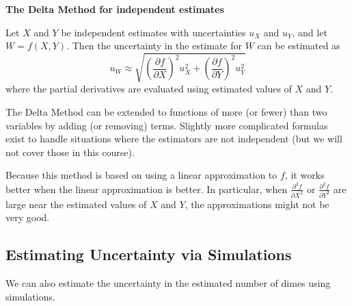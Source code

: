 \documentclass[twoside]{book}\usepackage[]{graphicx}\usepackage[]{xcolor}
\newlength{\tempfmlength}
\newenvironment{fmpage}[1]
     {
	 \medskip
	 \setlength{\tempfmlength}{#1}
	 \begin{lrbox}{\fmbox}
	   \begin{minipage}{#1}
		 \vspace*{.02\tempfmlength}
		 \hfill
	   \begin{minipage}{.95 \tempfmlength}}
		 {\end{minipage}\hfill
		 \vspace*{.015\tempfmlength}
		 \end{minipage}\end{lrbox}\fbox{\usebox{\fmbox}}
	 \medskip
	 }
\newenvironment{boxedText}[1][.98\textwidth]%
{%
\begin{center}
\begin{fmpage}{#1}
}%
{%
\end{fmpage}
\end{center}
}
\begin{document}
\begin{boxedText}
	\centerline{\textsf{\bfseries The Delta Method for independent estimates}}

	\medskip

	Let $X$ and $Y$ be independent estimates with uncertainties $u_{X}$ and $u_{Y}$,  
	and let $W = f(X,Y)$.
	Then the uncertainty in the estimate for $W$ can be estimated as 
	\[
	u_{W} \approx
	\sqrt{ 
\left(\frac{\partial f}{\partial X}\right)^2 u_X^2
+
\left(\frac{\partial f}{\partial Y}\right)^2 u_Y^2
	}
	\]
	where the partial derivatives are evaluated using estimated values of $X$ and $Y$.

	\medskip

	The Delta Method can be extended to functions of more (or fewer) than two variables by
	adding (or removing) terms.  Slightly more complicated formulas exist to handle
	situations where the estimators are not independent (but we will not cover those in this course).

	\medskip
	Because this method is based on using a linear approximation to $f$, it works better
	when the linear approximation is better.  In particular, when
	$\frac{\partial^2 f}{\partial X^2}$ or
	$\frac{\partial^2 f}{\partial Y^2}$ are large near the estimated 
	values of $X$ and $Y$, the approximations might not be very good.
\end{boxedText}

\subsection{Estimating Uncertainty via Simulations}

We can also estimate the uncertainty in the estimated number of dimes using simulations.
\end{document}
